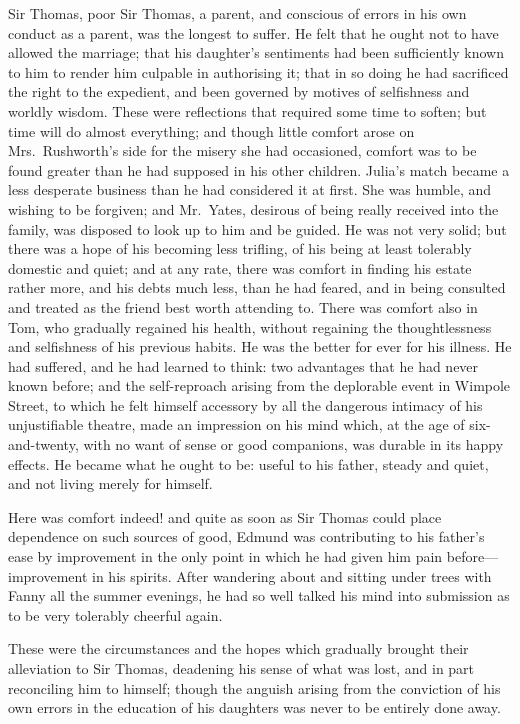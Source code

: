 Sir Thomas, poor Sir Thomas, a parent, and conscious of errors
in his own conduct as a parent, was the longest to suffer.
He felt that he ought not to have allowed the marriage;
that his daughter's sentiments had been sufficiently known
to him to render him culpable in authorising it; that in so
doing he had sacrificed the right to the expedient, and been
governed by motives of selfishness and worldly wisdom.
These were reflections that required some time to soften;
but time will do almost everything; and though little
comfort arose on Mrs.\ Rushworth's side for the misery she
had occasioned, comfort was to be found greater than he had
supposed in his other children.  Julia's match became a less
desperate business than he had considered it at first.
She was humble, and wishing to be forgiven; and Mr.\ Yates,
desirous of being really received into the family, was disposed
to look up to him and be guided.  He was not very solid;
but there was a hope of his becoming less trifling,
of his being at least tolerably domestic and quiet;
and at any rate, there was comfort in finding his estate
rather more, and his debts much less, than he had feared,
and in being consulted and treated as the friend best
worth attending to.  There was comfort also in Tom,
who gradually regained his health, without regaining the
thoughtlessness and selfishness of his previous habits.
He was the better for ever for his illness.  He had suffered,
and he had learned to think:  two advantages that he had
never known before; and the self-reproach arising from
the deplorable event in Wimpole Street, to which he felt
himself accessory by all the dangerous intimacy of his
unjustifiable theatre, made an impression on his mind which,
at the age of six-and-twenty, with no want of sense
or good companions, was durable in its happy effects.
He became what he ought to be:  useful to his father,
steady and quiet, and not living merely for himself.

Here was comfort indeed! and quite as soon as Sir
Thomas could place dependence on such sources of good,
Edmund was contributing to his father's ease by improvement
in the only point in which he had given him pain before---%
improvement in his spirits.  After wandering about and
sitting under trees with Fanny all the summer evenings,
he had so well talked his mind into submission as to be
very tolerably cheerful again.

These were the circumstances and the hopes which gradually
brought their alleviation to Sir Thomas, deadening his sense
of what was lost, and in part reconciling him to himself;
though the anguish arising from the conviction of his
own errors in the education of his daughters was never
to be entirely done away.

